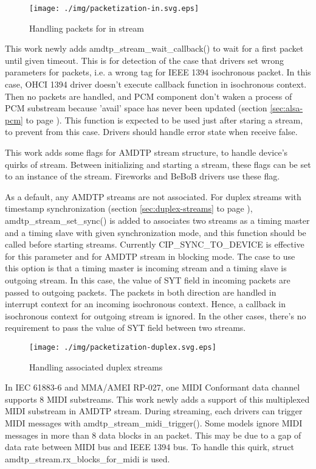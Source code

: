 \documentclass[onecolumn]{article}
\begin{document}
\begin{figure}[H]
	\centering
	\texttt{[image: ./img/packetization-in.svg.eps]}
	\caption{{Handling packets for in stream}}
	\label{fig:packetization-in}
\end{figure}

This work newly adds amdtp\_stream\_wait\_callback() to wait for a first packet until given timeout. This is for detection of the case that drivers set wrong parameters for packets, i.e. a wrong tag for IEEE 1394 isochronous packet. In this case, OHCI 1394 driver doesn't execute callback function in isochronous context. Then no packets are handled, and PCM component don't waken a process of PCM substream because 'avail' space has never been updated (section \ref{sec:alsa-pcm} to page \pageref{sec:alsa-pcm}). This function is expected to be used just after staring a stream, to prevent from this case. Drivers should handle error state when receive false.

This work adds some flags for AMDTP stream structure, to handle device's quirks of stream. Between initializing and starting a stream, these flags can be set to an instance of the stream. Fireworks and BeBoB drivers use these flag.

As a default, any AMDTP streams are not associated. For duplex streams with timestamp synchronization (section \ref{sec:duplex-streams} to page \pageref{sec:duplex-streams}), amdtp\_stream\_set\_sync() is added to  associates two streams as a timing master and a timing slave with given synchronization mode, and this function should be called before starting streams. Currently CIP\_SYNC\_TO\_DEVICE is effective for this parameter and for AMDTP stream in blocking mode. The case to use this option is that a timing master is incoming stream and a timing slave is outgoing stream. In this case, the value of SYT field in incoming packets are passed to outgoing packets. The packets in both direction are handled in interrupt context for an incoming isochronous context. Hence, a callback in isochronous context for outgoing stream is ignored. In the other cases, there's no requirement to pass the value of SYT field between two streams.

\begin{figure}[H]
	\centering
	\texttt{[image: ./img/packetization-duplex.svg.eps]}
	\caption{{Handling associated duplex streams}}
	\label{fig:packetization-duplex}
\end{figure}


In IEC 61883-6\cite{iec61883-6-1, iec61883-6-2} and MMA/AMEI RP-027\cite{amei-rp27}, one MIDI Conformant data channel supports 8 MIDI substreams. This work newly adds a support of this multiplexed MIDI substream in AMDTP stream. During streaming, each drivers can trigger MIDI messages with amdtp\_stream\_midi\_trigger(). Some models ignore MIDI messages in more than 8 data blocks in an packet. This may be due to a gap of data rate between MIDI bus and IEEE 1394 bus. To handle this quirk, struct amdtp\_stream.rx\_blocks\_for\_midi is used.
\end{document}
